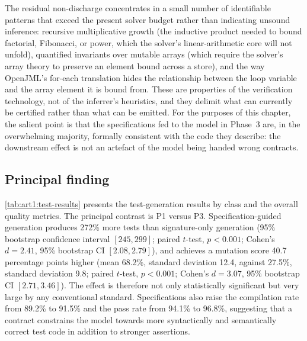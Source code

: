 The residual non-discharge concentrates in a small number of identifiable
patterns that exceed the present solver budget rather than indicating unsound
inference: recursive multiplicative growth (the inductive product needed to bound
factorial, Fibonacci, or power, which the solver's linear-arithmetic core will not
unfold), quantified invariants over mutable arrays (which require the solver's
array theory to preserve an element bound across a store), and the way OpenJML's
for-each translation hides the relationship between the loop variable and the
array element it is bound from. These are properties of the verification
technology, not of the inferrer's heuristics, and they delimit what can currently
be certified rather than what can be emitted. For the purposes of this chapter,
the salient point is that the specifications fed to the model in Phase~3 are, in
the overwhelming majority, formally consistent with the code they describe: the
downstream effect is not an artefact of the model being handed wrong contracts.

\subsection{Principal finding}
\label{sec:art1:principal}

\cref{tab:art1:test-results} presents the test-generation results by class and the
overall quality metrics. The principal contrast is P1 versus P3. Specification-guided
generation produces 272\% more tests than signature-only generation (95\% bootstrap
confidence interval $[245, 299]$; paired $t$-test, $p < 0.001$; Cohen's
$d = 2.41$, 95\% bootstrap CI $[2.08, 2.79]$), and achieves a mutation score 40.7
percentage points higher (mean 68.2\%, standard deviation 12.4, against 27.5\%,
standard deviation 9.8; paired $t$-test, $p < 0.001$; Cohen's $d = 3.07$, 95\%
bootstrap CI $[2.71, 3.46]$). The effect is therefore not only statistically
significant but very large by any conventional standard. Specifications also raise
the compilation rate from 89.2\% to 91.5\% and the pass rate from 94.1\% to
96.8\%, suggesting that a contract constrains the model towards more syntactically
and semantically correct test code in addition to stronger assertions.

